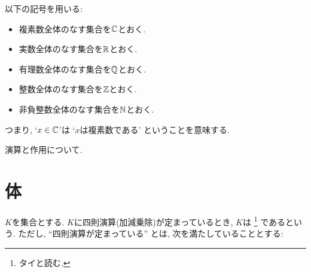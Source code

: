 以下の記号を用いる:
\begin{itemize}
\item 複素数全体のなす集合を$\mathbb{C}$とおく.
\item 実数全体のなす集合を$\mathbb{R}$とおく.
\item 有理数全体のなす集合を$\mathbb{Q}$とおく.
\item 整数全体のなす集合を$\mathbb{Z}$とおく.
\item 非負整数全体のなす集合を$\mathbb{N}$とおく.
\end{itemize}
つまり,
`$x\in\mathbb{C}$'は
`$x$は複素数である'
ということを意味する.

演算と作用について.

\section{体}
$K$を集合とする.
$K$に四則演算(加減乗除)が定まっているとき,
$K$は
\footnote{タイと読む.}
であるという.
ただし,
``四則演算が定まっている''
とは, 次を満たしていることとする:

